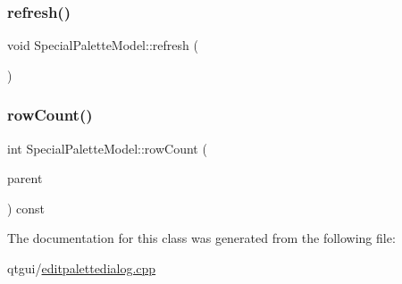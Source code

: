 \subsubsection{\texorpdfstring{refresh()}{refresh()}}
{\footnotesize\ttfamily void Special\+Palette\+Model\+::refresh (\begin{DoxyParamCaption}{ }\end{DoxyParamCaption})\hspace{0.3cm}{\ttfamily [inline]}}

\mbox{\label{class_special_palette_model_a6422b3c182e1c0f50b6c0dd33d702d5e}} 
\subsubsection{\texorpdfstring{rowCount()}{rowCount()}}
{\footnotesize\ttfamily int Special\+Palette\+Model\+::row\+Count (\begin{DoxyParamCaption}\item[{const Q\+Model\+Index \&}]{parent }\end{DoxyParamCaption}) const\hspace{0.3cm}{\ttfamily [inline]}}



The documentation for this class was generated from the following file\+:\begin{DoxyCompactItemize}
\item 
qtgui/\mbox{\hyperlink{editpalettedialog_8cpp}{editpalettedialog.\+cpp}}\end{DoxyCompactItemize}
